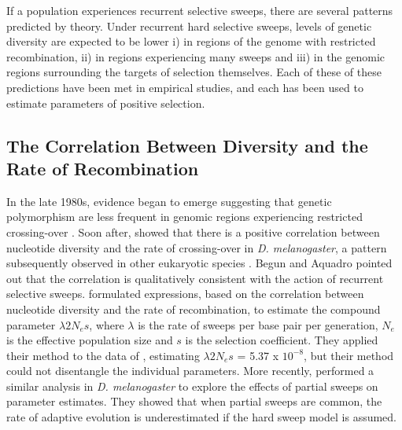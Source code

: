 If a population experiences recurrent selective sweeps, there are several patterns predicted by theory. Under recurrent hard selective sweeps, levels of genetic diversity are expected to be lower i) in regions of the genome with restricted recombination, ii) in regions experiencing many sweeps and iii) in the genomic regions surrounding the targets of selection themselves. Each of these of these predictions have been met in empirical studies, and each has been used to estimate parameters of positive selection.


\subsection[Using models of selective sweeps to estimate positive selection parameters]{The Correlation Between Diversity and the Rate of Recombination}

In the late 1980s, evidence began to emerge suggesting that genetic polymorphism are less frequent in genomic regions experiencing restricted crossing-over \citep{RN225,RN282}. Soon after, \cite{RN114} showed that there is a positive correlation between nucleotide diversity and the rate of crossing-over in \emph{D. melanogaster}, a pattern subsequently observed in other eukaryotic species \citep{RN117}. Begun and Aquadro pointed out that the correlation is qualitatively consistent with the action of recurrent selective sweeps. \cite{RN277} formulated expressions, based on the correlation between nucleotide diversity and the rate of recombination, to estimate the compound parameter $\lambda 2N_{e}s$, where $\lambda$ is the rate of sweeps per base pair per generation, $N_e$ is the effective population size and $s$ is the selection coefficient. They applied their method to the data of \cite{RN114}, estimating $\lambda2N_{e}s$ = 5.37 x $10^{-8}$, but their method could not disentangle the individual parameters. More recently, \cite{RN226} performed a similar analysis in \emph{D. melanogaster} to explore the effects of partial sweeps on parameter estimates. They showed that when partial sweeps are common, the rate of adaptive evolution is underestimated if the hard sweep model is assumed.
 
